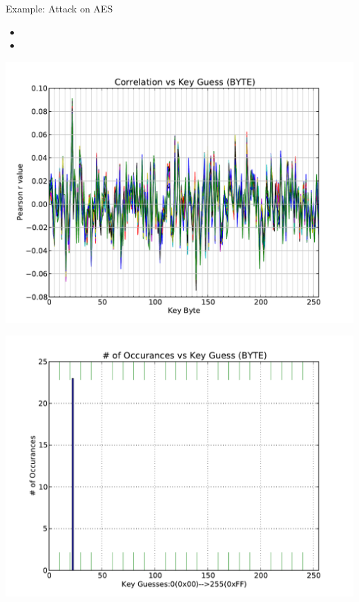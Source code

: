 \documentclass[xcolor=pdftex,dvipsnames,table,final]{beamer}
\begin{document}
\begin{frame}[fragile]{}
\begin{columns}[t]
\begin{column}{.31\linewidth}
\begin{block}{Example: Attack on AES}
\begin{minipage}[t]{0.49\linewidth}
	 \end{minipage}%
	 \begin{minipage}[t]{0.49\linewidth}  
		 \vspace{-6cm}
		 \begin{itemize}
		  \item 
		  \item 
		 \end{itemize}
         \end{minipage} 
	 
        \begin{minipage}[t]{0.49\linewidth}
           \includegraphics[width=0.9\linewidth]{../figures/pearsonsCoActual}
        \end{minipage}%
        \begin{minipage}[t]{0.49\linewidth}  
		\includegraphics[width=0.9\linewidth]{../figures/histPearsonsCoActual}
        \end{minipage}
	

\end{block}
\end{column}
\end{columns}
\end{frame}
\end{document}
